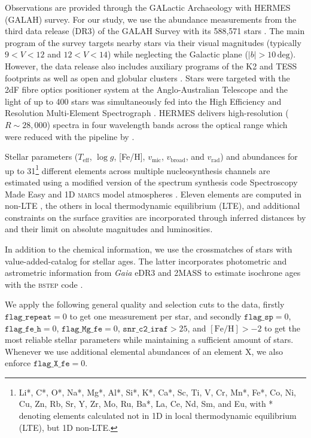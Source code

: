 \documentclass[fleqn,usenatbib]{mnras}
\newcommand{\Gaia}{\textit{Gaia}\xspace} %
\begin{document}
Observations are provided through the GALactic Archaeology with HERMES (GALAH) survey. For our study, we use the abundance measurements from the third data release (DR3) of the GALAH Survey with its 588,571 stars \citep{Buder2021}. The main program of the survey targets nearby stars via their visual magnitudes (typically $9 < V < 12$ and $12 < V < 14$) while neglecting the Galactic plane ($\vert b \vert > 10\,\mathrm{deg}$). However, the data release also includes auxiliary programs of the K2 and TESS footprints \citep{Sharma2018, Sharma2019} as well as open and globular clusters \cite[for more details see][]{Buder2021}. Stars were targeted with the 2dF fibre optics positioner system at the Anglo-Australian Telescope \citep{Heijmans2012, Farrell2014} and the light of up to 400 stars was simultaneously fed into the High Efficiency and Resolution Multi-Element Spectrograph \citep[HERMES,][]{Barden2010, Sheinis2015}. HERMES delivers high-resolution ($R \sim 28,000$) spectra in four wavelength bands across the optical range which were reduced with the pipeline by \citep{Kos2017}.

Stellar parameters ($T_\text{eff}$, $\log g$, [Fe/H], $v_\text{mic}$, $v_\text{broad}$, and $v_\text{rad}$) and abundances for up to 31\footnote{Li*, C*, O*, Na*, Mg*, Al*, Si*, K*, Ca*, Sc, Ti, V, Cr, Mn*, Fe*, Co, Ni, Cu, Zn, Rb, Sr, Y, Zr, Mo, Ru, Ba*, La, Ce, Nd, Sm, and Eu, with * denoting elements calculated not in 1D in local thermodynamic equilibrium (LTE), but 1D non-LTE.} different elements across multiple nucleosynthesis channels are estimated using a modified version of the spectrum synthesis code Spectroscopy Made Easy \citep[\textsc{sme}][]{Valenti1996, Piskunov2017} and 1D \textsc{marcs} model atmospheres \citep{Gustafsson2008}. Eleven elements are computed in non-LTE \citep{Amarsi2020}, the others in local thermodynamic equilibrium (LTE), and additional constraints on the surface gravities are incorporated through inferred distances by \citet{BailerJones2021} and their limit on absolute magnitudes and luminosities.

In addition to the chemical information, we use the crossmatches of stars with value-added-catalog for stellar ages. The latter incorporates photometric and astrometric information from \Gaia eDR3 \citep{Lindegren2021a} and 2MASS \citep{Skrutskie2006} to estimate isochrone ages with the \textsc{bstep} code \citep{Sharma2018}.

We apply the following general quality and selection cuts to the data, firstly $\texttt{flag\_repeat} = 0$ to get one measurement per star, and secondly $\texttt{flag\_sp} = 0$, $\texttt{flag\_fe\_h} = 0$, $\texttt{flag\_Mg\_fe} = 0$, $\texttt{snr\_c2\_iraf} > 25$, and $\mathrm{[Fe/H]} > -2$ to get the most reliable stellar parameters while maintaining a sufficient amount of stars. Whenever we use additional elemental abundances of an element X, we also enforce $\texttt{flag\_X\_fe} = 0$.
\end{document}
